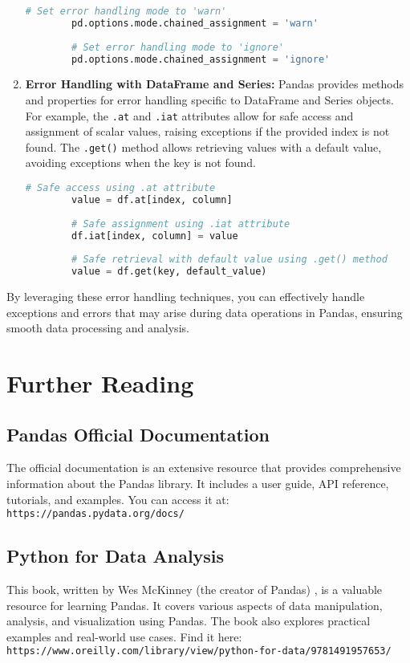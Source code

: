 \begin{enumerate}
\begin{lstlisting}[language=Python]
		# Set error handling mode to 'warn'
		pd.options.mode.chained_assignment = 'warn'
		
		# Set error handling mode to 'ignore'
		pd.options.mode.chained_assignment = 'ignore'
	\end{lstlisting}
	
	\item \textbf{Error Handling with DataFrame and Series:} Pandas provides methods and properties for error handling specific to DataFrame and Series objects. For example, the \texttt{.at} and \texttt{.iat} attributes allow for safe access and assignment of scalar values, raising exceptions if the provided index is not found. The \texttt{.get()} method allows retrieving values with a default value, avoiding exceptions when the key is not found.
	
	\begin{lstlisting}[language=Python]
		# Safe access using .at attribute
		value = df.at[index, column]
		
		# Safe assignment using .iat attribute
		df.iat[index, column] = value
		
		# Safe retrieval with default value using .get() method
		value = df.get(key, default_value)
	\end{lstlisting}
	
\end{enumerate}

By leveraging these error handling techniques, you can effectively handle exceptions and errors that may arise during data operations in Pandas, ensuring smooth data processing and analysis.


\section{Further Reading}
\subsection{Pandas Official Documentation}
The official documentation is an extensive resource that provides comprehensive information about the Pandas library. It includes a user guide, API reference, tutorials, and examples. You can access it at: \\
\texttt{https://pandas.pydata.org/docs/}

\subsection{Python for Data Analysis}
This book, written by Wes McKinney (the creator of Pandas) \cite{Mckinney:2022}, is a valuable resource for learning Pandas. It covers various aspects of data manipulation, analysis, and visualization using Pandas. The book also explores practical examples and real-world use cases. Find it here: \\
\texttt{https://www.oreilly.com/library/view/python-for-data/9781491957653/}

